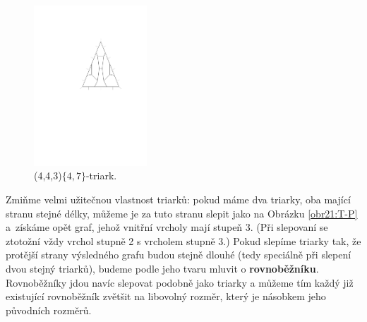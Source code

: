\begin{figure}[h!]\centering
\includegraphics[height=60mm]{../img/triarc}
\caption{(4,4,3)$ \lbrace 4,7\rbrace $-triark.}
\label{obr03:triark}
\end{figure}

Zmiňme velmi užitečnou vlastnost triarků: pokud máme dva triarky, oba mající stranu stejné délky, můžeme je za tuto stranu slepit jako na Obrázku \ref{obr21:T-P} a~získáme opět graf, jehož vnitřní vrcholy mají stupeň 3. (Při slepovaní se ztotožní vždy vrchol stupně 2 s vrcholem stupně 3.) Pokud slepíme triarky tak, že protější strany výsledného grafu budou stejně dlouhé (tedy speciálně při slepení dvou stejný triarků), budeme podle jeho tvaru mluvit o \textbf{rovnoběžníku}. Rovnoběžníky jdou navíc slepovat podobně jako triarky a můžeme tím každý již existující rovnoběžník zvětšit na libovolný rozměr, který je násobkem jeho původních rozměrů.


